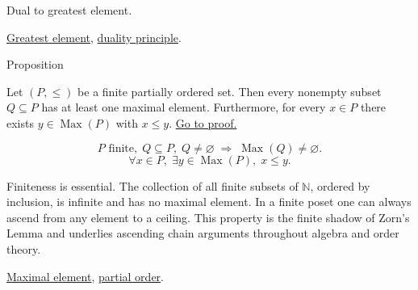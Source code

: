 \begin{remark*}[Interpretation]
Dual to greatest element.
\end{remark*}

\begin{dependencies}
\hyperref[def:greatest-element]{Greatest element},
\hyperref[prop:duality-principle]{duality principle}.
\end{dependencies}


\begin{propositionbox}{Proposition}
\begin{proposition}
\label{prop:finite-poset-maximal}
Let $(P, \leq)$ be a finite partially ordered set.  Then every nonempty
subset $Q \subseteq P$ has at least one maximal element.  Furthermore,
for every $x \in P$ there exists $y \in \operatorname{Max}(P)$ with
$x \leq y$.
\hyperref[prf:finite-poset-maximal]{Go to proof.}
\end{proposition}
\end{propositionbox}

\begin{remark*}
\[
P \text{ finite},\; Q \subseteq P,\; Q \neq \varnothing
\;\Longrightarrow\;
\operatorname{Max}(Q) \neq \varnothing.
\]
\[
\forall x \in P,\; \exists y \in \operatorname{Max}(P),\; x \leq y.
\]
\end{remark*}

\begin{remark*}[Interpretation]
Finiteness is essential.  The collection of all finite subsets of
$\mathbb{N}$, ordered by inclusion, is infinite and has no maximal
element.  In a finite poset one can always ascend from any element to
a ceiling.  This property is the finite shadow of Zorn's Lemma and
underlies ascending chain arguments throughout algebra and order theory.
\end{remark*}

\begin{dependencies}
\hyperref[def:maximal-element]{Maximal element},
\hyperref[def:lattice-order-partial-order]{partial order}.
\end{dependencies}
